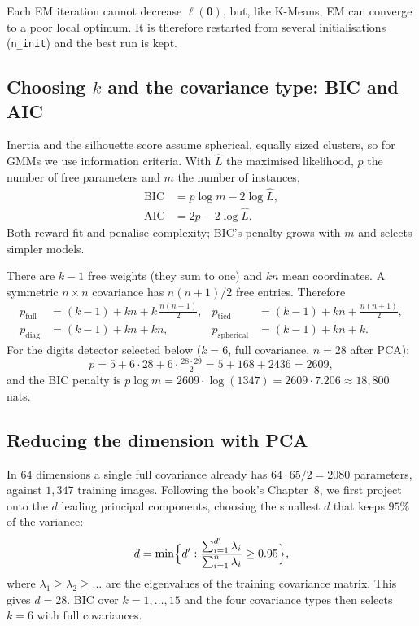 \documentclass[11pt,a4paper]{article}
\newcommand{\vtheta}{\boldsymbol{\theta}}
\begin{document}
Each EM iteration cannot decrease $\ell(\vtheta)$, but, like K-Means, EM can converge to a poor local optimum.
It is therefore restarted from several initialisations (\texttt{n\_init}) and the best run is kept.

\subsection{Choosing $k$ and the covariance type: BIC and AIC}
Inertia and the silhouette score assume spherical, equally sized clusters, so for GMMs we use information
criteria. With $\hat L$ the maximised likelihood, $p$ the number of free parameters and $m$ the number of
instances,
\begin{align}
  \text{BIC}&=p\log m-2\log\hat L, \label{eq:bic}\\
  \text{AIC}&=2p-2\log\hat L .
\end{align}
Both reward fit and penalise complexity; BIC's penalty grows with $m$ and selects simpler models.

\begin{proofbox}
There are $k-1$ free weights (they sum to one) and $kn$ mean coordinates. A symmetric $n\times n$ covariance has
$n(n+1)/2$ free entries. Therefore
\begin{align*}
  p_{\text{full}}&=(k-1)+kn+k\,\tfrac{n(n+1)}{2}, &
  p_{\text{tied}}&=(k-1)+kn+\tfrac{n(n+1)}{2},\\
  p_{\text{diag}}&=(k-1)+kn+kn, &
  p_{\text{spherical}}&=(k-1)+kn+k.
\end{align*}
For the digits detector selected below ($k=6$, full covariance, $n=28$ after PCA):
\begin{equation*}
  p=5+6\cdot28+6\cdot\tfrac{28\cdot29}{2}=5+168+2436=2609,
\end{equation*}
and the BIC penalty is $p\log m=2609\cdot\log(1347)=2609\cdot7.206\approx18{,}800$ nats.
\end{proofbox}

\subsection{Reducing the dimension with PCA}
In $64$ dimensions a single full covariance already has $64\cdot65/2=2080$ parameters, against $1{,}347$ training
images. Following the book's Chapter~8, we first project onto the $d$ leading principal components, choosing the
smallest $d$ that keeps $95\%$ of the variance:
\begin{equation}
  d=\min\Bigl\{d' : \frac{\sum_{i=1}^{d'}\lambda_i}{\sum_{i=1}^{n}\lambda_i}\ge0.95\Bigr\},
\end{equation}
where $\lambda_1\ge\lambda_2\ge\dots$ are the eigenvalues of the training covariance matrix. This gives $d=28$. BIC
over $k=1,\dots,15$ and the four covariance types then selects $k=6$ with full covariances.
\end{document}
